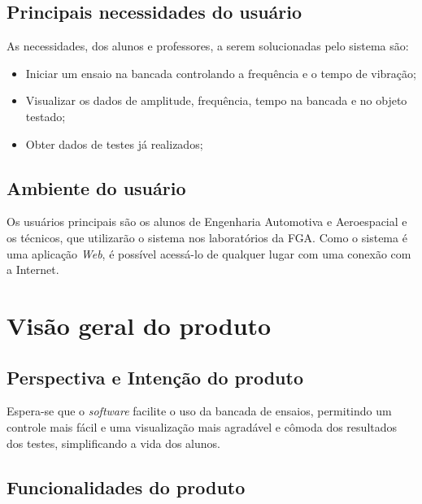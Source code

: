      \subsection*{Principais necessidades do usuário}
     As necessidades, dos alunos e professores, a serem solucionadas pelo sistema são:
     \begin{itemize}
		\item Iniciar um ensaio na bancada controlando a frequência e o tempo de vibração;
        \item Visualizar os dados de amplitude, frequência, tempo na bancada e no objeto testado;
        \item Obter dados de testes já realizados;
    \end{itemize}
    
     
	\subsection*{Ambiente do usuário}
    	
        Os usuários principais são os alunos de Engenharia Automotiva e Aeroespacial e os técnicos, que utilizarão o sistema nos laboratórios da FGA. Como o sistema é uma aplicação \textit{Web}, é possível acessá-lo de qualquer lugar com uma conexão com a Internet.
        
   
\section*{Visão geral do produto}

	\subsection*{Perspectiva e Intenção do produto}
    	Espera-se que o \textit{software} facilite o uso da bancada de ensaios, permitindo um controle mais fácil e uma visualização mais agradável e cômoda dos resultados dos testes, simplificando a vida dos alunos.
        
    \subsection*{Funcionalidades do produto}
    
